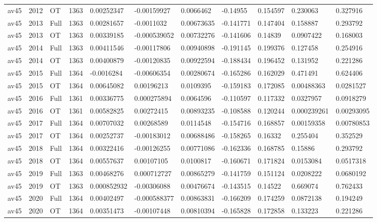 \begin{landscape}
\begin{longtable}{lllllllllll}
av45 & 2012 & OT & 1363 & 0.00252347 & -0.00159927 & 0.0066462 & -0.14955 & 0.154597 & 0.230063 & 0.327916 \\
av45 & 2013 & Full & 1363 & 0.00281657 & -0.0011032 & 0.00673635 & -0.141771 & 0.147404 & 0.158887 & 0.293792 \\
av45 & 2013 & OT & 1363 & 0.00339185 & -0.000539052 & 0.00732276 & -0.141606 & 0.14839 & 0.0907422 & 0.168003 \\
av45 & 2014 & Full & 1363 & 0.00411546 & -0.00117806 & 0.00940898 & -0.191145 & 0.199376 & 0.127458 & 0.254916 \\
av45 & 2014 & OT & 1363 & 0.00400879 & -0.00120835 & 0.00922594 & -0.188434 & 0.196452 & 0.131952 & 0.221286 \\
av45 & 2015 & Full & 1364 & -0.0016284 & -0.00606354 & 0.00280674 & -0.165286 & 0.162029 & 0.471491 & 0.624406 \\
av45 & 2015 & OT & 1364 & 0.00645082 & 0.00196213 & 0.0109395 & -0.159183 & 0.172085 & 0.00488363 & 0.0281527 \\
av45 & 2016 & Full & 1361 & 0.00336775 & 0.000275894 & 0.0064596 & -0.110597 & 0.117332 & 0.0327957 & 0.0918279 \\
av45 & 2016 & OT & 1361 & 0.00582825 & 0.00272415 & 0.00893235 & -0.108588 & 0.120244 & 0.000239261 & 0.00293095 \\
av45 & 2017 & Full & 1364 & 0.00707032 & 0.00268589 & 0.0114548 & -0.154716 & 0.168857 & 0.00159358 & 0.00780853 \\
av45 & 2017 & OT & 1364 & 0.00252737 & -0.00183012 & 0.00688486 & -0.158265 & 0.16332 & 0.255404 & 0.352529 \\
av45 & 2018 & Full & 1364 & 0.00322416 & -0.00126255 & 0.00771086 & -0.162336 & 0.168785 & 0.15886 & 0.293792 \\
av45 & 2018 & OT & 1364 & 0.00557637 & 0.00107105 & 0.0100817 & -0.160671 & 0.171824 & 0.0153084 & 0.0517318 \\
av45 & 2019 & Full & 1363 & 0.00468276 & 0.000712727 & 0.00865279 & -0.141759 & 0.151124 & 0.0208222 & 0.0680192 \\
av45 & 2019 & OT & 1363 & 0.000852932 & -0.00306088 & 0.00476674 & -0.143515 & 0.14522 & 0.669074 & 0.762433 \\
av45 & 2020 & Full & 1364 & 0.00402497 & -0.000588377 & 0.00863831 & -0.166209 & 0.174259 & 0.0872138 & 0.194249 \\
av45 & 2020 & OT & 1364 & 0.00351473 & -0.00107448 & 0.00810394 & -0.165828 & 0.172858 & 0.133223 & 0.221286 \\

\end{longtable}
\end{landscape}

